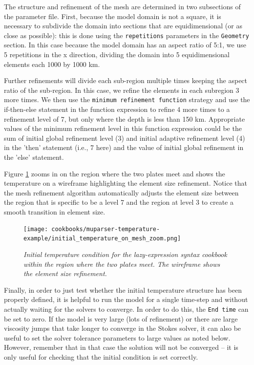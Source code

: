 \documentclass{article}
\begin{document}
The structure and refinement of the mesh are determined in two subsections of the parameter file. First, because the model domain is not a square, it is necessary to subdivide the domain into sections that are equidimensional (or as close as possible): this is done using the \texttt{repetitions} parameters in the \texttt{Geometry} section. In this case because the model domain has an aspect ratio of 5:1, we use 5 repetitions in the x direction, dividing the domain into 5 equidimensional elements each 1000 by 1000 km.

Further refinements will divide each sub-region multiple times keeping the aspect ratio of the sub-region. In this case, we refine the elements in each subregion 3 more times. We then use the \texttt{minimum refinement function} strategy and use the if-then-else statement in the function expression to refine 4 more times to a refinement level of 7, but only where the depth is less than 150 km. Appropriate values of the minimum refinement level in this function expression could be the sum of initial global refinement level (3) and initial adaptive refinement level (4) in the 'then' statement (i.e., 7 here) and the value of initial global refinement in the 'else' statement.

Figure \ref{lazy-expression-tempic-zoom} zooms in on the region where the two plates meet and shows the temperature on a wireframe highlighting the element size refinement. Notice that the mesh refinement algorithm automatically adjusts the element size between the region that is specific to be a level 7 and the region at level 3 to create a smooth transition in element size.
\begin{figure}
\centering
\texttt{[image: cookbooks/muparser-temperature-example/initial\_temperature\_on\_mesh\_zoom.png]}
\caption{\it Initial temperature condition for the lazy-expression syntax cookbook within the region where the two plates meet. The wireframe shows the element size refinement. \label{lazy-expression-tempic-zoom}}
\end{figure}

Finally, in order to just test whether the initial temperature structure has been properly defined, it is helpful to run the model for a single time-step and without actually waiting for the solvers to converge. In order to do this, the \texttt{End time} can be set to zero. If the model is very large (lots of refinement) or there are large viscosity jumps that take longer to converge in the Stokes solver, it can also be useful to set the solver tolerance parameters to large values as noted below. However, remember that in that case the solution will not be converged -- it is only useful for checking that the initial condition is set correctly.

\end{document}
